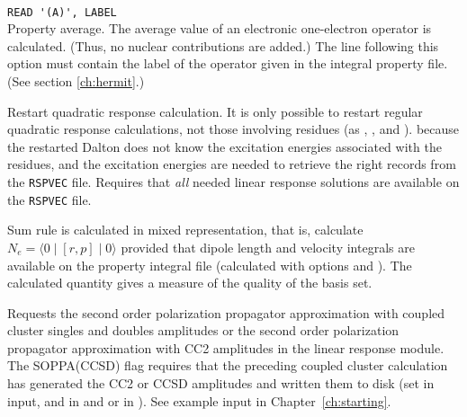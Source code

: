 \begin{description}
\item{} \\
\verb|READ '(A)', LABEL|\\
Property average.
The average value of an electronic one-electron
operator is calculated.
(Thus, no nuclear contributions are added.)
The line following this option must contain the
label of the operator given in the integral property file.
(See section \ref{ch:hermit}.)

\item{}
Restart quadratic response
calculation.
It is only possible to restart regular quadratic response calculations, not those
involving residues (as , , and ).
because the restarted Dalton does not know the excitation energies associated with the
residues, and the excitation energies are needed to retrieve the right records from
the \verb|RSPVEC| file.
Requires that {\em all} needed linear response solutions %
are available on the \verb|RSPVEC| file.

\item{}
Sum rule is calculated in mixed representation, that is, calculate
$N_e=\langle0\mid [r,p] \mid0\rangle$ provided that dipole length and
velocity integrals are available on the property integral file
(calculated with  options  and ).
The calculated quantity gives a measure of the quality of the basis
set.

\item{}
Requests the second order polarization propagator approximation with
coupled cluster singles and doubles amplitudes or the second order
polarization propagator approximation with CC2 amplitudes in the linear
response module. The SOPPA(CCSD)
 flag requires that the preceding coupled cluster
calculation has generated the CC2 or CCSD amplitudes and written them
to disk (set  in  input,  and
 in   and 
 or  in ). See example input in
Chapter~\ref{ch:starting}.


\end{description}
